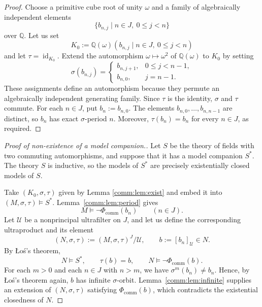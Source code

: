 \documentclass[10pt,a4paper]{amsart}
\renewcommand{\le}{\leqslant}
\theoremstyle{definition}
\newcommand{\Q}{\mathbb Q}
\DeclareMathOperator{\id}{id}
\begin{document}
\begin{proof}
Choose a primitive cube root of unity $\omega$ and a family
of algebraically independent elements
\[
\{b_{n,j}\mid n\in J,\ 0\le j<n\}
\]
over $\Q$. Let us set
\[
K_0:=\Q(\omega)(b_{n,j}\mid n\in J,\ 0\le j<n)
\]
 and let $\tau=\id_{K_0}$. Extend the automorphism
$\omega\mapsto\omega^2$ of $\Q(\omega)$ to $K_0$ by setting
\[
\sigma(b_{n,j})=
\begin{cases}
b_{n,j+1},&0\le j<n-1,\\
b_{n,0},&j=n-1.
\end{cases}
\]
These assignments define an automorphism because they
permute an algebraically independent generating family.
Since $\tau$ is the identity, $\sigma$ and $\tau$ commute.
For each $n\in J$, put $b_n:=b_{n,0}$. The elements
$b_{n,0},\ldots,b_{n,n-1}$ are distinct, so $b_n$ has exact
$\sigma$-period $n$. Moreover, $\tau(b_n)=b_n$ for every
$n\in J$, as required.
\end{proof}

\begin{proof}[Proof of non-existence of a model companion.]
Let $S$ be the theory of fields with two commuting automorphisms,
and suppose that it has a model companion $S^*$.
The theory $S$ is inductive, so the models of $S^*$ are precisely
 existentially closed models of $S$.

Take $(K_0,\sigma,\tau)$ given by Lemma \ref{comm:lem:exist} and embed it into
$(M,\sigma,\tau)\models S^*$.
Lemma~\ref{comm:lem:period} gives
\[
  M\models\neg\Phi_{\mathrm{comm}}(b_n)
  \qquad(n\in J).
\]
Let $\mathcal U$ be a nonprincipal ultrafilter on $J$, and let us define the corresponding ultraproduct and its element
\[
  (N,\sigma,\tau):=(M,\sigma,\tau)^J/\mathcal U,
  \qquad b:=[b_n]_{\mathcal U}\in N.
\]
By \L o\'s's theorem,
\[
  N\models S^*,\qquad
  \tau(b)=b,\qquad
  N\models\neg\Phi_{\mathrm{comm}}(b).
\]
For each $m>0$ and each $n\in J$ with $n>m$, we have
$\sigma^m(b_n)\ne b_n$.
Hence, by \L o\'s's theorem again,
 $b$ has infinite $\sigma$-orbit.
Lemma~\ref{comm:lem:infinite} supplies an extension of $(N,\sigma,\tau)$
 satisfying $\Phi_{\mathrm{comm}}(b)$, which
contradicts the existential closedness of $N$.
\end{proof}
\end{document}
